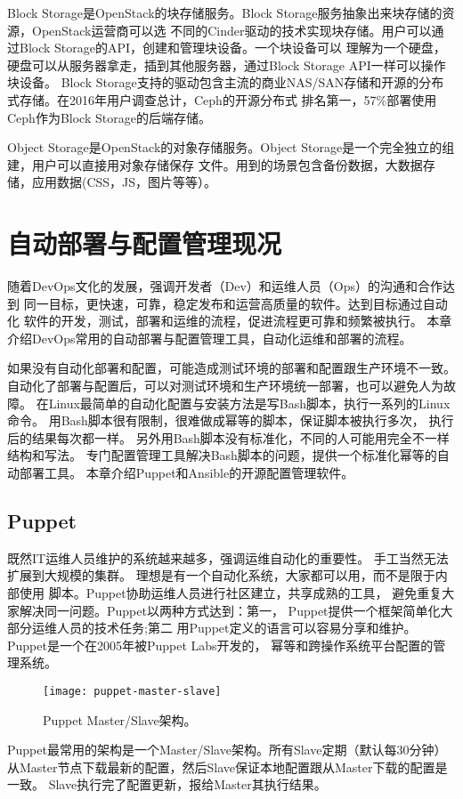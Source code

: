 Block Storage是OpenStack的块存储服务。Block Storage服务抽象出来块存储的资源，OpenStack运营商可以选
不同的Cinder驱动的技术实现块存储。用户可以通过Block Storage的API，创建和管理块设备。一个块设备可以
理解为一个硬盘，硬盘可以从服务器拿走，插到其他服务器，通过Block Storage API一样可以操作块设备。
Block Storage支持的驱动包含主流的商业NAS/SAN存储和开源的分布式存储。在2016年用户调查总计，Ceph的开源分布式
排名第一，57\%部署使用Ceph作为Block Storage的后端存储。

Object Storage是OpenStack的对象存储服务。Object Storage是一个完全独立的组建，用户可以直接用对象存储保存
文件。用到的场景包含备份数据，大数据存储，应用数据(CSS，JS，图片等等）。



\section{自动部署与配置管理现况}
\label{subsec:automated_deployment}
随着DevOps文化的发展，强调开发者（Dev）和运维人员（Ops）的沟通和合作达到
同一目标，更快速，可靠，稳定发布和运营高质量的软件。达到目标通过自动化
软件的开发，测试，部署和运维的流程，促进流程更可靠和频繁被执行。
本章介绍DevOps常用的自动部署与配置管理工具，自动化运维和部署的流程。

如果没有自动化部署和配置，可能造成测试环境的部署和配置跟生产环境不一致。
自动化了部署与配置后，可以对测试环境和生产环境统一部署，也可以避免人为故障。
在Linux最简单的自动化配置与安装方法是写Bash脚本，执行一系列的Linux命令。
用Bash脚本很有限制，很难做成幂等的脚本，保证脚本被执行多次，
执行后的结果每次都一样。
另外用Bash脚本没有标准化，不同的人可能用完全不一样结构和写法。
专门配置管理工具解决Bash脚本的问题，提供一个标准化幂等的自动部署工具。
本章介绍Puppet和Ansible的开源配置管理软件。


\subsection{Puppet}
既然IT运维人员维护的系统越来越多，强调运维自动化的重要性。
手工当然无法扩展到大规模的集群。
理想是有一个自动化系统，大家都可以用，而不是限于内部使用
脚本。Puppet协助运维人员进行社区建立，共享成熟的工具，
避免重复大家解决同一问题。Puppet以两种方式达到：第一，
Puppet提供一个框架简单化大部分运维人员的技术任务;第二
用Puppet定义的语言可以容易分享和维护。
Puppet是一个在2005年被Puppet Labs开发的，
幂等和跨操作系统平台配置的管理系统。\cite{puppet_docs}

\begin{wrapfigure}{r}{0.40\textwidth}
  \centering
    \texttt{[image: puppet-master-slave]}
    \caption{Puppet Master/Slave架构。\cite{puppet_docs}}
  \label{fig:puppet-master-slave}
\end{wrapfigure}
Puppet最常用的架构是一个Master/Slave架构。所有Slave定期（默认每30分钟）
从Master节点下载最新的配置，然后Slave保证本地配置跟从Master下载的配置是一致。
Slave执行完了配置更新，报给Master其执行结果。

